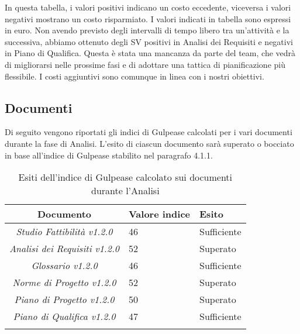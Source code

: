 In questa tabella, i valori positivi indicano un costo eccedente, viceversa i valori negativi mostrano un costo risparmiato.
I valori indicati in tabella sono espressi in euro.
Non avendo previsto degli intervalli di tempo libero tra un'attività e la successiva, abbiamo ottenuto degli SV positivi in Analisi dei Requisiti e negativi in Piano di Qualifica.
Questa è stata una mancanza da parte del team, che vedrà di migliorarsi nelle prossime fasi e di adottare una tattica di pianificazione più flessibile.
I costi aggiuntivi sono comunque in linea con i nostri obiettivi.


\subsection{Documenti}
\label{6.2}
Di seguito vengono riportati gli indici di Gulpease calcolati per i vari documenti durante la fase di Analisi. L'esito di ciascun documento sarà superato o bocciato in base all'indice di Gulpease stabilito nel paragrafo 4.1.1.

\begin{longtable}{|c|p{3cm}|p{3cm}|}
\toprule
\textbf{Documento} & \textbf{Valore indice} & \textbf{Esito} \\


\midrule
\emph{Studio Fattibilità v1.2.0} & 46 & Sufficiente\\
\midrule
\emph{Analisi dei Requisiti v1.2.0} & 52& Superato\\
\midrule
\emph{Glossario v1.2.0} & 46 & Sufficiente\\
\midrule
\emph{Norme di Progetto v1.2.0} & 52 & Superato\\
\midrule
\emph{Piano di Progetto v1.2.0} & 50 & Superato\\
\midrule
\emph{Piano di Qualifica v1.2.0} & 47 & Sufficiente\\
\bottomrule
\caption{Esiti dell'indice di Gulpease calcolato sui documenti durante l'Analisi}
\label{tab:changelog}
\end{longtable}
















